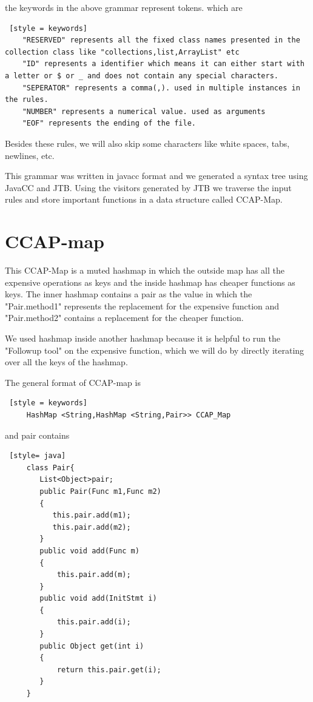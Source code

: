 the keywords in the above grammar represent tokens. which are

\begin{lstlisting} [style = keywords]
    "RESERVED" represents all the fixed class names presented in the collection class like "collections,list,ArrayList" etc
    "ID" represents a identifier which means it can either start with a letter or $ or _ and does not contain any special characters.
    "SEPERATOR" represents a comma(,). used in multiple instances in the rules.
    "NUMBER" represents a numerical value. used as arguments
    "EOF" represents the ending of the file.
\end{lstlisting}

Besides these rules, we will also skip some characters like white spaces, tabs, newlines, etc.

This grammar was written in javacc format and we generated a syntax tree using JavaCC and JTB. Using the visitors generated by JTB we traverse the input rules and store important functions in a data structure called CCAP-Map.

\section{CCAP-map}
This CCAP-Map is a muted hashmap in which the outside map has all the expensive operations as keys and the inside hashmap has cheaper functions as keys. The inner hashmap contains a pair as the value in which the "Pair.method1" represents the replacement for the expensive function and "Pair.method2" contains a replacement for the cheaper function.

 We used hashmap inside another hashmap because it is helpful to run the "Followup tool" on the expensive function, which we will do by directly iterating over all the keys of the hashmap.

 The general format of CCAP-map is 
 \begin{lstlisting} [style = keywords]
     HashMap <String,HashMap <String,Pair>> CCAP_Map
 \end{lstlisting}
 and pair contains 
 \begin{lstlisting} [style= java]
     class Pair{
        List<Object>pair;
        public Pair(Func m1,Func m2)
        {
           this.pair.add(m1);
           this.pair.add(m2);
        }
        public void add(Func m)
        {
            this.pair.add(m);
        }
        public void add(InitStmt i)
        {
            this.pair.add(i);
        }
        public Object get(int i)
        {
            return this.pair.get(i);
        }
     }
     
 \end{lstlisting}


